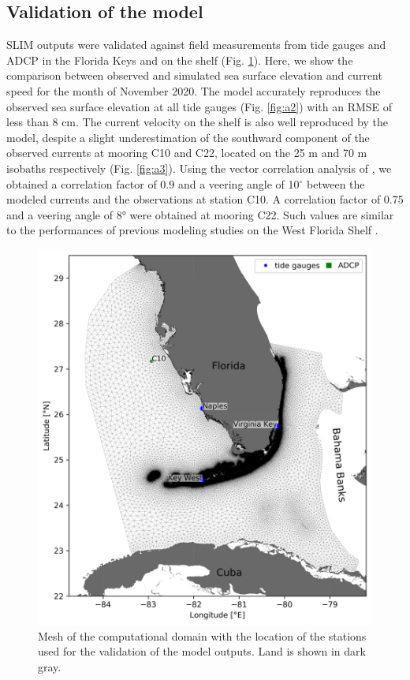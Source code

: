 \begin{subappendices}
	\section{Validation of the model}
	
	SLIM outputs were validated against field measurements from tide gauges and ADCP in the Florida Keys and on the shelf (Fig. \ref{fig:a1}). Here, we show the comparison between observed and simulated sea surface elevation and current speed for the month of November 2020. The model accurately reproduces the observed sea surface elevation at all tide gauges (Fig. \ref{fig:a2}) with an RMSE of less than 8 cm. The current velocity on the shelf is also  well reproduced by the model, despite a slight underestimation of the southward component of the observed currents at mooring C10 and C22, located on the 25 m and 70 m isobaths respectively (Fig. \ref{fig:a3}). Using the vector correlation analysis of \citep{kundu1976ekman}, we obtained a correlation factor of 0.9 and a veering angle of 10$^\circ$ between the modeled currents and the observations at station C10. A correlation factor of 0.75 and a veering angle of 8° were obtained at mooring C22. Such values are similar to the performances of previous modeling studies on the West Florida Shelf \cite{liu2020impacts}.
		
	\begin{figure}
		\centering
		\includegraphics[width=.8\textwidth]{chapters/drto/figures/a1.JPEG}
		\caption{Mesh of the computational domain with the location of the stations used for the validation of the model outputs. Land is shown in dark gray.}
		\label{fig:a1}
	\end{figure}
	

\end{subappendices}

